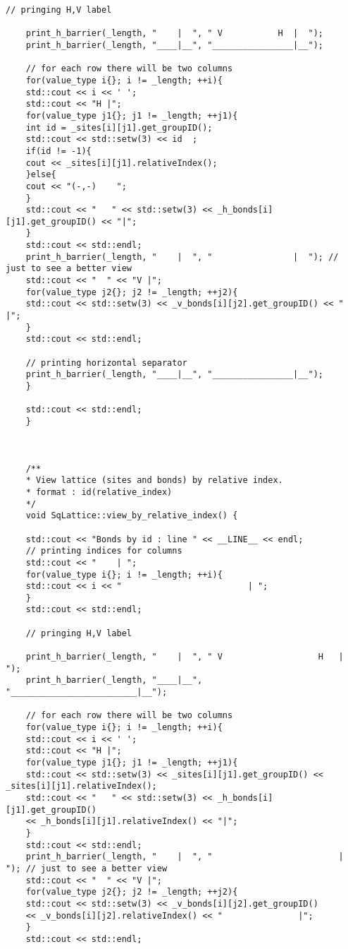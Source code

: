 \begin{lstlisting}[style=CStyle]
	// pringing H,V label
	
	print_h_barrier(_length, "    |  ", " V           H  |  ");
	print_h_barrier(_length, "____|__", "________________|__");
	
	// for each row there will be two columns
	for(value_type i{}; i != _length; ++i){
	std::cout << i << ' ';
	std::cout << "H |";
	for(value_type j1{}; j1 != _length; ++j1){
	int id = _sites[i][j1].get_groupID();
	std::cout << std::setw(3) << id  ;
	if(id != -1){
	cout << _sites[i][j1].relativeIndex();
	}else{
	cout << "(-,-)    ";
	}
	std::cout << "   " << std::setw(3) << _h_bonds[i][j1].get_groupID() << "|";
	}
	std::cout << std::endl;
	print_h_barrier(_length, "    |  ", "                |  "); // just to see a better view
	std::cout << "  " << "V |";
	for(value_type j2{}; j2 != _length; ++j2){
	std::cout << std::setw(3) << _v_bonds[i][j2].get_groupID() << "               |";
	}
	std::cout << std::endl;
	
	// printing horizontal separator
	print_h_barrier(_length, "____|__", "________________|__");
	}
	
	std::cout << std::endl;
	}
	
	
	
	/**
	* View lattice (sites and bonds) by relative index.
	* format : id(relative_index)
	*/
	void SqLattice::view_by_relative_index() {
	
	std::cout << "Bonds by id : line " << __LINE__ << endl;
	// printing indices for columns
	std::cout << "    | ";
	for(value_type i{}; i != _length; ++i){
	std::cout << i << "                         | ";
	}
	std::cout << std::endl;
	
	// pringing H,V label
	
	print_h_barrier(_length, "    |  ", " V                   H   |  ");
	print_h_barrier(_length, "____|__", "_________________________|__");
	
	// for each row there will be two columns
	for(value_type i{}; i != _length; ++i){
	std::cout << i << ' ';
	std::cout << "H |";
	for(value_type j1{}; j1 != _length; ++j1){
	std::cout << std::setw(3) << _sites[i][j1].get_groupID() << _sites[i][j1].relativeIndex();
	std::cout << "   " << std::setw(3) << _h_bonds[i][j1].get_groupID()
	<< _h_bonds[i][j1].relativeIndex() << "|";
	}
	std::cout << std::endl;
	print_h_barrier(_length, "    |  ", "                         |  "); // just to see a better view
	std::cout << "  " << "V |";
	for(value_type j2{}; j2 != _length; ++j2){
	std::cout << std::setw(3) << _v_bonds[i][j2].get_groupID()
	<< _v_bonds[i][j2].relativeIndex() << "               |";
	}
	std::cout << std::endl;
	

\end{lstlisting}
